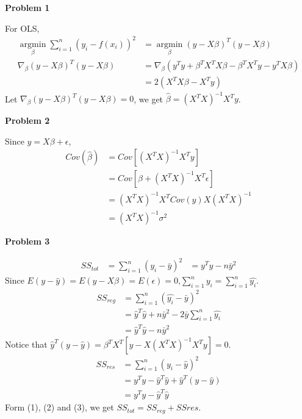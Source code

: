 \documentclass[UTF8,12pt]{article}
\newenvironment{problem}[2][Problem]
{ \begin{mdframed}[backgroundcolor=gray!20] \textbf{#1 #2}}
	{  \end{mdframed}}
\newenvironment{answer}
{}%
{}
\newenvironment{eq}
{
	\begin{equation}
		\begin{aligned}
}
{
		\end{aligned}
	\end{equation}
}
\begin{document}
\renewcommand{\qed}{\quad\qedsymbol}
\begin{problem}{1}
\end{problem}
\begin{answer}
	For OLS,
	\begin{eq}\nonumber
		\mathop{argmin}\limits_{\beta}\sum_{i=1}^n (y_i-f(x_i))^2
		&= \mathop{argmin}\limits_{\beta}(y-X\beta)^T(y-X\beta)\\
		\nabla_{\beta}(y-X\beta)^T(y-X\beta)
		&=  \nabla_{\beta} (y^Ty+\beta^T X^T X \beta
		-\beta^T X^T y - y^T X\beta)\\
		&= 2 (X^T X \beta- X^T y)
	\end{eq}
	Let $\nabla_{\beta}(y-X\beta)^T(y-X\beta) =0$,
	we get $\hat{\beta}=(X^T X)^{-1}X^T y$.
\end{answer}

\begin{problem}{2}
\end{problem}
\begin{answer}
	Since $y=X\beta+\epsilon$,\\
	\begin{eq}\nonumber
		Cov({\hat{\beta}})
		&=Cov[(X^T X)^{-1}X^T y]\\
		&=Cov[\beta + (X^T X)^{-1}X^T\epsilon]\\
		&=(X^T X)^{-1}X^T Cov(y) X (X^T X)^{-1}\\
		&= (X^T X)^{-1} \sigma^2
	\end{eq}
\end{answer}

\begin{problem}{3}
\end{problem}
\begin{answer}
	\begin{eq}
		SS_{tot} &= \sum_{i=1}^n (y_i-\bar{y})^2
		&= y^T y-n\bar{y}^2
	\end{eq}
	Since $E(y-\hat{y})=E(y-X\beta)=E(\epsilon)=0$,$\sum_{i=1}^n y_i=\sum_{i=1}^n \hat{y_i}$.
	\begin{eq}
		SS_{reg} &= \sum_{i=1}^n (\hat{y_i}-\bar{y})^2\\
		&= \hat{y}^T \hat{y} + n\bar{y}^2 - 2\bar{y}\sum_{i=1}^n \hat{y_i}\\
		&= \hat{y}^T \hat{y} - n\bar{y}^2
	\end{eq}
	Notice that  $\hat{y}^T(y-\hat{y})
		=\beta^T X^T [y-X(X^T X)^{-1}X^T y] = 0 $.
	\begin{eq}
		SS_{res} &= \sum_{i=1}^n (y_i-\hat{y})^2\\
		&= y^T y - \hat{y}^T \hat{y} +\hat{y}^T(y-\hat{y})\\
		&= y^T y - \hat{y}^T \hat{y}
	\end{eq}
	Form (1), (2) and (3), we get $SS_{tot}=SS_{reg}+SS{res}$.
\end{answer}
\end{document}
